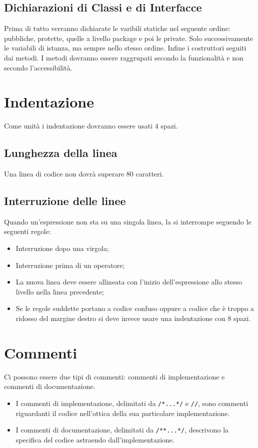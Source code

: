 \documentclass[11pt,titlepage,a4paper]{report}
\begin{document}
\subsection{Dichiarazioni di Classi e di Interfacce}
Prima di tutto verranno dichiarate le varibili statiche nel seguente ordine: pubbliche, protette, quelle a livello package e poi le private. Solo successivamente le variabili di istanza, ma sempre nello stesso ordine. Infine i costruttori seguiti dai metodi. I metodi dovranno essere raggrupati secondo la funzionalit\`a e non secondo l'accessibilit\`a.
\section{Indentazione}
Come unit\`a i indentazione dovranno essere usati 4 spazi.
\subsection{Lunghezza della linea}
Una linea di codice non dovr\`a superare 80 caratteri.
\subsection{Interruzione delle linee}
Quando un'espressione non sta su una singola linea, la si interrompe seguendo le seguenti regole:
\begin{itemize}
\item Interruzione dopo una virgola;
\item Interruzione prima di un operatore;
\item La nuova linea deve essere allineata con l'inizio dell'espressione allo stesso livello nella linea precedente;
\item Se le regole suddette portano a codice confuso oppure a codice che è troppo a ridosso del margine destro si deve invece usare una indentazione con 8 spazi.
\end{itemize}
\section{Commenti}
Ci possono essere due tipi di commenti: commenti di implementazione e commenti di documentazione. 
\begin{itemize}
\item I commenti di implementazione, delimitati da \texttt{/*...*/} e \texttt{//}, sono commenti riguardanti il codice nell'ottica della sua particolare implementazione. 
\item I commenti di documentazione, delimitati da \texttt{/**...*/}, descrivono la specifica del codice astraendo dall'implementazione.
\end{itemize}
\end{document}

